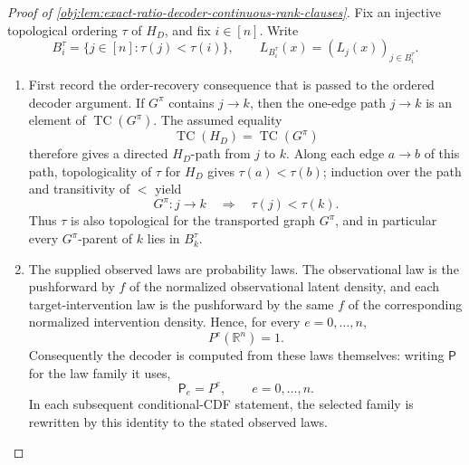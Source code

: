 \begin{proof}[Proof of \cref{obj:lem:exact-ratio-decoder-continuous-rank-clauses}]
Fix an injective topological ordering \(\tau\) of \(H_D\), and fix \(i\in[n]\).  Write
\[
B_i^\tau=\{j\in[n]:\tau(j)<\tau(i)\},
\qquad
L_{B_i^\tau}(x)=(L_j(x))_{j\in B_i^\tau}.
\]

\begin{enumerate}
\item First record the order-recovery consequence that is passed to the ordered decoder argument.  If \(G^\pi\) contains \(j\to k\), then the one-edge path \(j\to k\) is an element of \(\operatorname{TC}(G^\pi)\).  The assumed equality
\[
\operatorname{TC}(H_D)=\operatorname{TC}(G^\pi)
\]
therefore gives a directed \(H_D\)-path from \(j\) to \(k\).  Along each edge \(a\to b\) of this path, topologicality of \(\tau\) for \(H_D\) gives \(\tau(a)<\tau(b)\); induction over the path and transitivity of \(<\) yield
\[
G^\pi:j\to k
\quad\Longrightarrow\quad
\tau(j)<\tau(k).
\]
Thus \(\tau\) is also topological for the transported graph \(G^\pi\), and in particular every \(G^\pi\)-parent of \(k\) lies in \(B_k^\tau\). %

\item The supplied observed laws are probability laws.  The observational law is the pushforward by \(f\) of the normalized observational latent density, and each target-intervention law is the pushforward by the same \(f\) of the corresponding normalized intervention density.  Hence, for every \(e=0,\ldots,n\),
\[
P^e(\mathbb R^n)=1.
\]
Consequently the decoder is computed from these laws themselves: writing \(\mathsf P\) for the law family it uses,
\[
\mathsf P_e=P^e,\qquad e=0,\ldots,n.
\]
In each subsequent conditional-CDF statement, the selected family is rewritten by this identity to the stated observed laws. %


\end{enumerate}
\end{proof}
